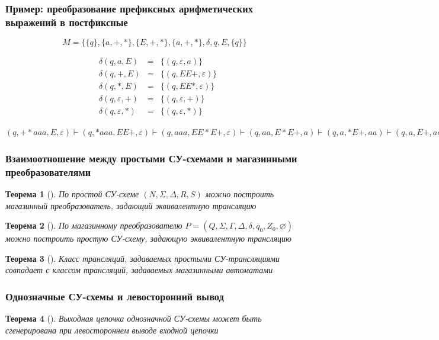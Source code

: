 \documentclass{beamer}
\newtheorem{rutheorem}{Теорема}
\begin{document}
\begin{frame}[fragile]
  \transwipe[direction=90]
  \frametitle{Пример: преобразование префиксных арифметических выражений в постфиксные}
$$M = \{ \{ q \}, \{ a, +, * \}, \{ E, +, * \}, \{ a, +, * \}, \delta, q, E, \{ q \} \}$$

$$
\begin{array}{crcl}
&\delta(q, a, E)& = & \{ (q, \varepsilon, a) \} \\
&\delta(q, +, E)& = & \{ (q, EE+, \varepsilon) \} \\
&\delta(q, *, E)& = & \{ (q, EE*, \varepsilon) \} \\
&\delta(q, \varepsilon, +)& = & \{ (q, \varepsilon, +) \} \\
&\delta(q, \varepsilon, *)& = & \{ (q, \varepsilon, *) \}
\end{array}
$$

\vfill

$(q, +*aaa, E, \varepsilon) \vdash (q, *aaa, EE+, \varepsilon) \vdash (q, aaa, EE*E+, \varepsilon) \vdash (q, aa, E*E+, a) \vdash (q, a, *E+, aa) \vdash (q, a, E+, aa*) \vdash (q, \varepsilon, +, aa*a) \vdash (q, \varepsilon, \varepsilon, aa*a+)$
\end{frame}

\begin{frame}[fragile]
  \transwipe[direction=90]
  \frametitle{Взаимоотношение между простыми СУ-схемами и магазинными преобразователями}
  \begin{rutheorem}[]
    По простой СУ-схеме $( N, \Sigma, \Delta, R, S )$  можно построить магазинный преобразователь, задающий эквивалентную трансляцию
  \end{rutheorem}

  \vfill

  \begin{rutheorem}[]
    По магазинному преобразователю $P = (Q, \Sigma, \Gamma, \Delta, \delta, q_0, Z_0, \varnothing) $ можно построить простую СУ-схему, задающую эквивалентную трансляцию
  \end{rutheorem}

  \vfill

  \begin{rutheorem}[]
    Класс трансляций, задаваемых простыми СУ-трансляциями совпадает с классом трансляций, задаваемых магазинными автоматами
  \end{rutheorem}
\end{frame}


\begin{frame}[fragile]
  \transwipe[direction=90]
  \frametitle{Однозначные СУ-схемы и левосторонний вывод}



\begin{rutheorem}[]
Выходная цепочка однозначной СУ-схемы может быть сгенерирована при левостороннем выводе входной цепочки
\end{rutheorem}

\end{frame}
\end{document}
